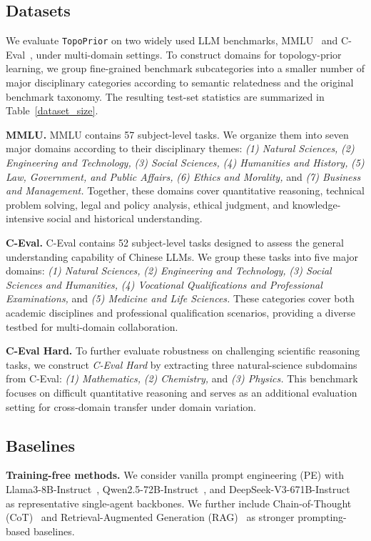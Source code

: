 \documentclass[lettersize,journal]{IEEEtran}
\theoremstyle{plain}
\begin{document}
\subsection{Datasets}
\label{app_datasets}
We evaluate \texttt{TopoPrior} on two widely used LLM benchmarks, MMLU~\cite{DBLP:conf/iclr/HendrycksBBZMSS21} and C-Eval~\cite{DBLP:conf/nips/HuangBZZZSLLZLF23}, under multi-domain settings. To construct domains for topology-prior learning, we group fine-grained benchmark subcategories into a smaller number of major disciplinary categories according to semantic relatedness and the original benchmark taxonomy. The resulting test-set statistics are summarized in Table~\ref{dataset_size}.

\noindent\textbf{MMLU.}
MMLU contains 57 subject-level tasks. We organize them into seven major domains according to their disciplinary themes:
\textit{(1) Natural Sciences,}
\textit{(2) Engineering and Technology,}
\textit{(3) Social Sciences,}
\textit{(4) Humanities and History,}
\textit{(5) Law, Government, and Public Affairs,}
\textit{(6) Ethics and Morality,} and
\textit{(7) Business and Management.}
Together, these domains cover quantitative reasoning, technical problem solving, legal and policy analysis, ethical judgment, and knowledge-intensive social and historical understanding.

\noindent\textbf{C-Eval.}
C-Eval contains 52 subject-level tasks designed to assess the general understanding capability of Chinese LLMs. We group these tasks into five major domains:
\textit{(1) Natural Sciences,}
\textit{(2) Engineering and Technology,}
\textit{(3) Social Sciences and Humanities,}
\textit{(4) Vocational Qualifications and Professional Examinations,} and
\textit{(5) Medicine and Life Sciences.}
These categories cover both academic disciplines and professional qualification scenarios, providing a diverse testbed for multi-domain collaboration.

\noindent\textbf{C-Eval Hard.}
To further evaluate robustness on challenging scientific reasoning tasks, we construct \emph{C-Eval Hard} by extracting three natural-science subdomains from C-Eval:
\textit{(1) Mathematics,}
\textit{(2) Chemistry,} and
\textit{(3) Physics.}
This benchmark focuses on difficult quantitative reasoning and serves as an additional evaluation setting for cross-domain transfer under domain variation.

\subsection{Baselines}
\label{baselines_app}
\noindent\textbf{Training-free methods.}
We consider vanilla prompt engineering (PE) with Llama3-8B-Instruct~\cite{touvron2023}, Qwen2.5-72B-Instruct~\cite{DBLP:journals/corr/abs-2412-15115}, and DeepSeek-V3-671B-Instruct~\cite{deepseekai2025} as representative single-agent backbones. We further include Chain-of-Thought (CoT)~\cite{DBLP:conf/nips/Wei0SBIXCLZ22} and Retrieval-Augmented Generation (RAG)~\cite{DBLP:conf/nips/LewisPPPKGKLYR020} as stronger prompting-based baselines.
\end{document}
